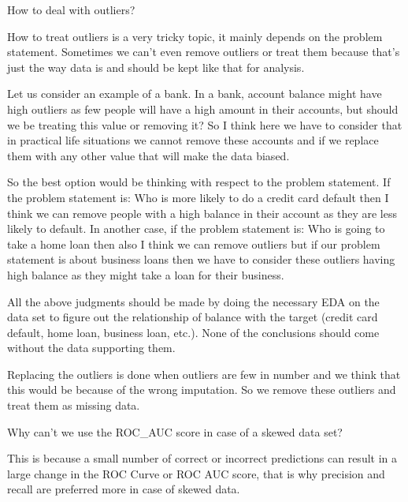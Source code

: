 	\begin{qanda}
		\begin{question}
How to deal with outliers?
		\end{question}

		\begin{answer}
How to treat outliers is a very tricky topic, it mainly depends on the problem statement. Sometimes we can't even remove outliers or treat them because that's just the way data is and should be kept like that for analysis.

Let us consider an example of a bank.  In a bank, account balance might have high outliers as few people will have a high amount in their accounts, but should we be treating this value or removing it? So I think here we have to consider that in practical life situations we cannot remove these accounts and if we replace them with any other value that will make the data biased.

So the best option would be thinking with respect to the problem statement. If the problem statement is: Who is more likely to do a credit card default then I think we can remove people with a high balance in their account as they are less likely to default. In another case, if the problem statement is: Who is going to take a home loan then also I think we can remove outliers but if our problem statement is about business loans then we have to consider these outliers having high balance as they might take a loan for their business.

All the above judgments should be made by doing the necessary EDA on the data set to figure out the relationship of balance with the target (credit card default, home loan, business loan, etc.). None of the conclusions should come without the data supporting them.

Replacing the outliers is done when outliers are few in number and we think that this would be because of the wrong imputation. So we remove these outliers and treat them as missing data.
		\end{answer}
	\end{qanda}

	\begin{qanda}
		\begin{question}
Why can't we use the ROC\_AUC score in case of a skewed data set?
		\end{question}

		\begin{answer}
This is because a small number of correct or incorrect predictions can result in a large change in the ROC Curve or ROC AUC score, that is why precision and recall are preferred more in case of skewed data.
		\end{answer}
	\end{qanda}

